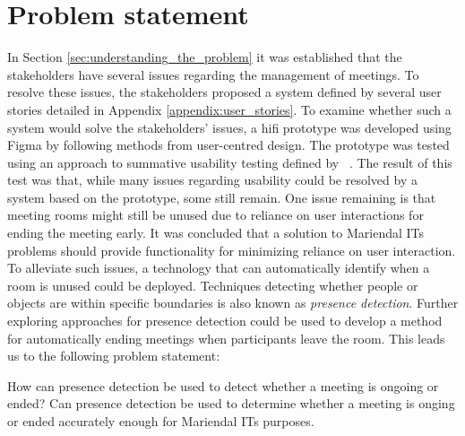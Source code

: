 \section{Problem statement}\label{sec:problem_statement}
In Section \ref{sec:understanding_the_problem} it was established that the stakeholders have several issues regarding the management of meetings. 
To resolve these issues, the stakeholders proposed a system defined by several user stories detailed in Appendix \ref{appendix:user_stories}. 
To examine whether such a system would solve the stakeholders' issues, a hifi prototype was developed using Figma\cite{Figma} by following methods from user-centred design.
The prototype was tested using an approach to summative usability testing defined by \citeauthor{lazar2005web}~\cite{lazar2005web}. 
The result of this test was that, while many issues regarding usability could be resolved by a system based on the prototype, some still remain. 
One issue remaining is that meeting rooms might still be unused due to reliance on user interactions for ending the meeting early.
It was concluded that a solution to Mariendal ITs problems should provide functionality for minimizing reliance on user interaction.
To alleviate such issues, a technology that can automatically identify when a room is unused could be deployed. 
Techniques detecting whether people or objects are within specific boundaries is also known as \textit{presence detection}.
Further exploring approaches for presence detection could be used to develop a method for automatically ending meetings when participants leave the room.
This leads us to the following problem statement:
\begin{problem_statement}
    How can presence detection be used to detect whether a meeting is ongoing or ended?
    Can presence detection be used to determine whether a meeting is onging or ended accurately enough for Mariendal ITs purposes.  
\end{problem_statement}

